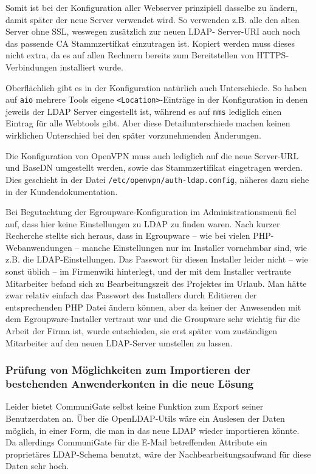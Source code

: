 \documentclass[11pt,a4paper,titlepage=firstiscover,headsepline,bibtotoc]{scrartcl} %
\begin{document}
Somit ist bei der Konfiguration aller Webserver prinzipiell dasselbe zu ändern, damit später der neue Server verwendet wird. So verwenden z.B. alle den alten Server ohne SSL, weswegen zusätzlich zur neuen LDAP- Server-URI auch noch das passende CA Stammzertifkat einzutragen ist. Kopiert werden muss dieses nicht extra, da es auf allen Rechnern bereits zum Bereitstellen von HTTPS-Verbindungen installiert wurde. 

Oberflächlich gibt es in der Konfiguration natürlich auch Unterschiede. So haben auf \texttt{aio} mehrere Tools eigene \texttt{<Location>}-Einträge in der Konfiguration in denen jeweils der LDAP Server eingestellt ist, während es auf \texttt{nms} lediglich einen Eintrag für alle Webtools gibt. Aber diese Detailunterschiede machen keinen wirklichen Unterschied bei den später vorzunehmenden Änderungen.

Die Konfiguration von OpenVPN muss auch lediglich auf die neue Server-URL und BaseDN umgestellt werden, sowie das Stammzertifikat eingetragen werden. Dies geschieht in der Datei \texttt{/etc/openvpn/auth-ldap.config}, näheres dazu siehe  in der Kundendokumentation.

Bei Begutachtung der Egroupware-Konfiguration im Administrationsmenü fiel auf, dass hier keine Einstellungen zu LDAP zu finden waren. Nach kurzer Recherche stellte sich heraus, dass in Egroupware -- wie bei vielen PHP-Webanwendungen -- manche Einstellungen nur im Installer vornehmbar sind, wie z.B. die LDAP-Einstellungen. Das Passwort für diesen Installer leider nicht -- wie sonst üblich -- im Firmenwiki hinterlegt, und der mit dem Installer vertraute Mitarbeiter befand sich zu Bearbeitungszeit des Projektes im Urlaub. Man hätte zwar relativ einfach das Passwort des Installers durch Editieren der entsprechenden PHP Datei ändern können, aber da keiner der Anwesenden mit dem Egroupware-Installer vertraut war und die Groupware sehr wichtig für die Arbeit der Firma ist, wurde entschieden, sie erst später vom zuständigen Mitarbeiter auf den neuen LDAP-Server umstellen zu lassen. 

\subsubsection{Prüfung von Möglichkeiten zum Importieren der bestehenden Anwenderkonten in die neue Lösung} \label{sec:Importsuche}
Leider bietet CommuniGate selbst keine Funktion zum Export seiner Benutzerdaten an. Über die OpenLDAP-Utils wäre ein Auslesen der Daten möglich, in einer Form, die man in das neue LDAP wieder importieren könnte. Da allerdings CommuniGate für die E-Mail betreffenden Attribute ein proprietäres LDAP-Schema benutzt, wäre der Nachbearbeitungsaufwand für diese Daten sehr hoch. 
\end{document}
